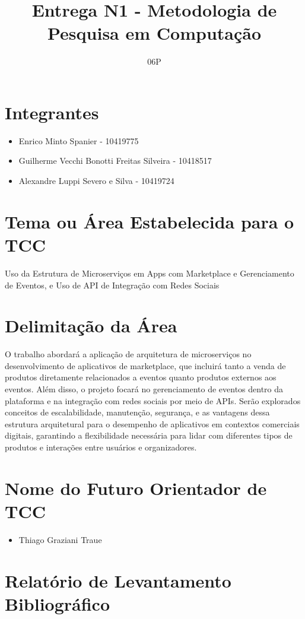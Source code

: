 \documentclass[a4paper,12pt]{article}
\title{Entrega N1 - Metodologia de Pesquisa em Computação}
\author{}
\date{06P}
\begin{document}
\maketitle
\tableofcontents
\newpage


\section{Integrantes}
\begin{itemize}
    \item Enrico Minto Spanier - 10419775
    \item Guilherme Vecchi Bonotti Freitas Silveira - 10418517
    \item Alexandre Luppi Severo e Silva - 10419724
\end{itemize}

\section{Tema ou Área Estabelecida para o TCC}
Uso da Estrutura de Microserviços em Apps com Marketplace e Gerenciamento de Eventos, e Uso de API de Integração com Redes Sociais

\section{Delimitação da Área}
O trabalho abordará a aplicação de arquitetura de microserviços no desenvolvimento de aplicativos de marketplace, que incluirá tanto a venda de produtos diretamente relacionados a eventos quanto produtos externos aos eventos. Além disso, o projeto focará no gerenciamento de eventos dentro da plataforma e na integração com redes sociais por meio de APIs. Serão explorados conceitos de escalabilidade, manutenção, segurança, e as vantagens dessa estrutura arquitetural para o desempenho de aplicativos em contextos comerciais digitais, garantindo a flexibilidade necessária para lidar com diferentes tipos de produtos e interações entre usuários e organizadores.

\section{Nome do Futuro Orientador de TCC}
\begin{itemize}
    \item Thiago Graziani Traue
\end{itemize}

\section{Relatório de Levantamento Bibliográfico}
\end{document}
